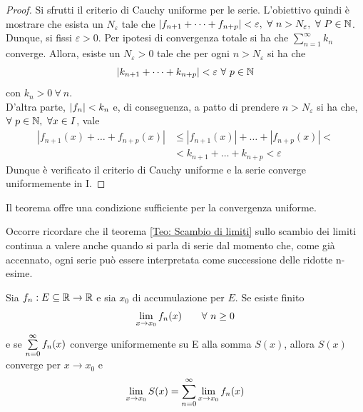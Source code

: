 \begin{proof}
    Si sfrutti il criterio di Cauchy uniforme per le serie. L'obiettivo quindi è mostrare che esista un $N_\varepsilon$ tale che $|f_{n+1}+ \dots+ f_{n+p}|< \varepsilon,\ \forall\ n > N_\varepsilon,\ \forall\ P\in \mathbb{N}$.\\
    Dunque, si fissi $\varepsilon>0$. Per ipotesi di convergenza totale si ha che $\sum\limits_{n=1}^{\infty}{k_n}$ converge. Allora, esiste un $N_\varepsilon>0$ tale che per ogni $n>N_\varepsilon$ si ha che 
    \begin{equation}
        |k_{n+1}+\dots+k_{n+p}|< \varepsilon\ \forall\ p \in \mathbb{N}
    \end{equation}
   con $k_n>0\ \forall\ n$.\\
   D'altra parte, $|f_n|<k_n$ e, di conseguenza, a patto di prendere $n> N_\varepsilon$ si ha che, $\forall\ p \in \mathbb{N},\ \forall x \in I$, vale
    \begin{equation}
    \begin{aligned}
        |f_{n+1}(x)+ \dots + f_{n+p}(x)| &\leq |f_{n+1}(x)|+ \dots + |f_{n+p}(x)|<\\ 
        &< k_{n+1}+ \dots + k_{n+p} < \varepsilon
    \end{aligned}
    \end{equation}
    Dunque è verificato il criterio di Cauchy uniforme e la serie converge uniformemente in I.
\end{proof}
\begin{oss}
    Il teorema offre una condizione sufficiente per la convergenza uniforme.
\end{oss}
Occorre ricordare che il teorema \ref{Teo: Scambio di limiti} sullo scambio dei limiti continua a valere anche quando si parla di serie dal momento che, come già accennato, ogni serie può essere interpretata come successione delle ridotte n-esime.
\begin{theorem}
    Sia $f_n: E \subseteq \mathbb{R} \to \mathbb{R}$ e sia $x_0$ di accumulazione per $E$. Se esiste finito
    \begin{equation}
        \lim_{x \to x_0}{f_n(x)} \qquad \forall\ n\geq0
    \end{equation}
    e se $\sum\limits_{n=0}^{\infty}{f_n(x)}$ converge uniformemente su E alla somma $S(x)$, allora $S(x)$ converge per $x \to x_0$ e 
    \begin{equation}
        \lim_{x \to x_0}{S(x)= \sum\limits_{n=0}^{\infty}{\lim_{x \to x_0}{f_n(x)}}}
    \end{equation}
\end{theorem}
